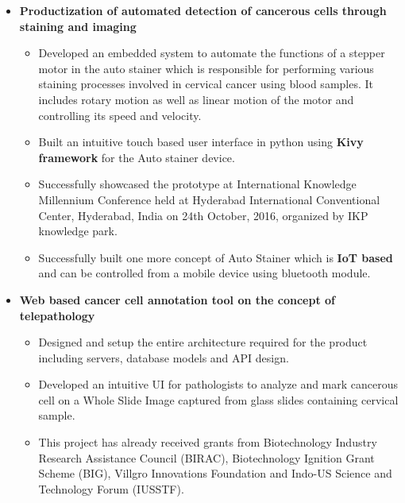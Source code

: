 \documentclass[11pt,letterpaper,sans]{moderncv}        %
\begin{document}
\begin{small}
\begin{itemize}
\vspace{2pt}

\item \textbf{Productization of automated detection of cancerous cells through staining and imaging}
\begin{itemize}
\item Developed an embedded system to automate the functions of a stepper motor in the auto stainer which is responsible for performing various staining processes involved in cervical cancer using blood samples. It includes rotary motion as well as linear motion of the motor and controlling its speed and velocity.
\vspace{1pt}
\item Built an intuitive touch based user interface in python using \textbf{Kivy framework} for the Auto stainer device.
\vspace{1pt}
\item Successfully showcased the prototype at International Knowledge Millennium Conference held at Hyderabad International Conventional Center, Hyderabad, India on 24th October, 2016, organized by IKP knowledge park.
\vspace{1pt}
\item Successfully built one more concept of Auto Stainer which is \textbf{IoT based} and can be controlled from a mobile device using bluetooth module.
\end{itemize}

\vspace{2pt}

\item \textbf{Web based cancer cell annotation tool on the concept of telepathology}
\begin{itemize}
\item Designed and setup the entire architecture required for the product including servers, database models and API design.
\vspace{1pt}
\item Developed an intuitive UI for pathologists to analyze and mark cancerous cell on a Whole Slide Image captured from glass slides containing cervical sample.
\vspace{1pt}
\item This project has already received grants from Biotechnology Industry Research Assistance Council (BIRAC), Biotechnology Ignition Grant Scheme (BIG), Villgro Innovations Foundation and Indo-US Science and Technology Forum (IUSSTF).
\end{itemize}

\end{itemize}
\end{small}
\end{document}
